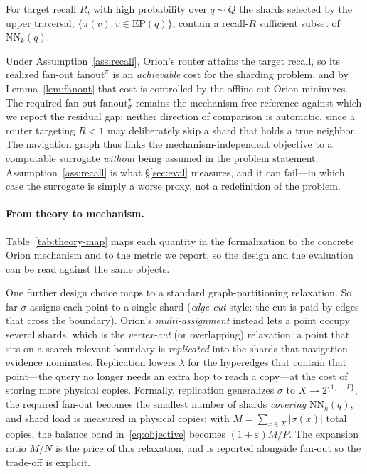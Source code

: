 \begin{assumption}
\label{ass:recall}
For target recall $R$, with high probability over $q\sim Q$ the shards selected by
the upper traversal, $\{\pi(v):v\in\mathrm{EP}(q)\}$, contain a recall-$R$
sufficient subset of $\mathrm{NN}_k(q)$.
\end{assumption}

Under Assumption~\ref{ass:recall}, Orion's router attains the target recall, so
its realized fan-out $\mathrm{fanout}^\pi$ is an \emph{achievable} cost for the
sharding problem, and by Lemma~\ref{lem:fanout} that cost is controlled by the
offline cut Orion minimizes. The required fan-out
$\mathrm{fanout}^\star_\sigma$ remains the mechanism-free reference against which
we report the residual gap; neither direction of comparison is automatic, since a
router targeting $R<1$ may deliberately skip a shard that holds a true neighbor.
The navigation graph thus links the mechanism-independent
objective to a computable surrogate \emph{without} being assumed in the problem
statement; Assumption~\ref{ass:recall} is what \S\ref{sec:eval} measures, and it
can fail---in which case the surrogate is simply a worse proxy, not a redefinition
of the problem.

\paragraph{From theory to mechanism.}
Table~\ref{tab:theory-map} maps each quantity in the formalization to the
concrete Orion mechanism and to the metric we report, so the design and the
evaluation can be read against the same objects.

One further design choice maps to a standard graph-partitioning relaxation.
So far $\sigma$ assigns each point to a single shard (\emph{edge-cut} style:
the cut is paid by edges that cross the boundary). Orion's
\emph{multi-assignment} instead lets a point occupy several shards, which is
the \emph{vertex-cut} (or overlapping) relaxation: a point that sits on a
search-relevant boundary is \emph{replicated} into the shards that navigation
evidence nominates. Replication lowers $\lambda$ for the hyperedges that
contain that point---the query no longer needs an extra hop to reach a copy---at
the cost of storing more physical copies. Formally, replication generalizes
$\sigma$ to $X\to 2^{\{1,\dots,P\}}$, the required fan-out becomes the smallest
number of shards \emph{covering} $\mathrm{NN}_k(q)$, and shard load is measured in
physical copies: with $M=\sum_{x\in X}|\sigma(x)|$ total copies, the balance band
in~\eqref{eq:objective} becomes $(1\pm\varepsilon)M/P$. The expansion ratio $M/N$
is the price of this relaxation, and is reported alongside fan-out so the
trade-off is explicit.

